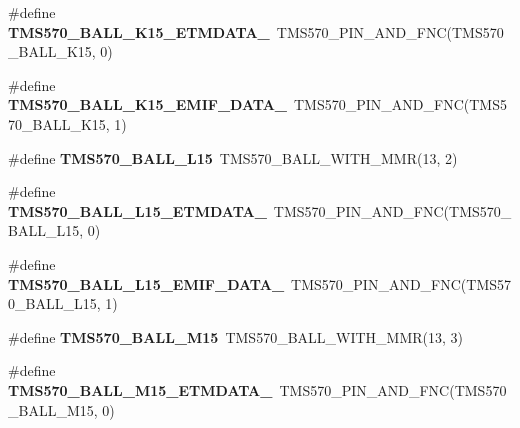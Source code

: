 \begin{DoxyCompactItemize}
\item 
\mbox{\label{tms570lc4357-pins_8h_a6abf2d88ba42097d22c416eb3ec99c76}} 
\#define {\bfseries T\+M\+S570\+\_\+\+B\+A\+L\+L\+\_\+\+K15\+\_\+\+E\+T\+M\+D\+A\+T\+A\+\_}~T\+M\+S570\+\_\+\+P\+I\+N\+\_\+\+A\+N\+D\+\_\+\+F\+NC(T\+M\+S570\+\_\+\+B\+A\+L\+L\+\_\+\+K15, 0)
\item 
\mbox{\label{tms570lc4357-pins_8h_a5742dc7d2b26fbe5a4986009c8fdc75c}} 
\#define {\bfseries T\+M\+S570\+\_\+\+B\+A\+L\+L\+\_\+\+K15\+\_\+\+E\+M\+I\+F\+\_\+\+D\+A\+T\+A\+\_}~T\+M\+S570\+\_\+\+P\+I\+N\+\_\+\+A\+N\+D\+\_\+\+F\+NC(T\+M\+S570\+\_\+\+B\+A\+L\+L\+\_\+\+K15, 1)
\item 
\mbox{\label{tms570lc4357-pins_8h_a1db68205f6e199d164d67c6847e1fc36}} 
\#define {\bfseries T\+M\+S570\+\_\+\+B\+A\+L\+L\+\_\+\+L15}~T\+M\+S570\+\_\+\+B\+A\+L\+L\+\_\+\+W\+I\+T\+H\+\_\+\+M\+MR(13, 2)
\item 
\mbox{\label{tms570lc4357-pins_8h_ad6840fd16bf18f681fe82a1b625f6f8f}} 
\#define {\bfseries T\+M\+S570\+\_\+\+B\+A\+L\+L\+\_\+\+L15\+\_\+\+E\+T\+M\+D\+A\+T\+A\+\_}~T\+M\+S570\+\_\+\+P\+I\+N\+\_\+\+A\+N\+D\+\_\+\+F\+NC(T\+M\+S570\+\_\+\+B\+A\+L\+L\+\_\+\+L15, 0)
\item 
\mbox{\label{tms570lc4357-pins_8h_aa8f11c8b56f97cc585b0ae4b6296056a}} 
\#define {\bfseries T\+M\+S570\+\_\+\+B\+A\+L\+L\+\_\+\+L15\+\_\+\+E\+M\+I\+F\+\_\+\+D\+A\+T\+A\+\_}~T\+M\+S570\+\_\+\+P\+I\+N\+\_\+\+A\+N\+D\+\_\+\+F\+NC(T\+M\+S570\+\_\+\+B\+A\+L\+L\+\_\+\+L15, 1)
\item 
\mbox{\label{tms570lc4357-pins_8h_aea686635fd948c0124ff0323afc6760e}} 
\#define {\bfseries T\+M\+S570\+\_\+\+B\+A\+L\+L\+\_\+\+M15}~T\+M\+S570\+\_\+\+B\+A\+L\+L\+\_\+\+W\+I\+T\+H\+\_\+\+M\+MR(13, 3)
\item 
\mbox{\label{tms570lc4357-pins_8h_adc50016a8e9c0fad14581e4855a6e377}} 
\#define {\bfseries T\+M\+S570\+\_\+\+B\+A\+L\+L\+\_\+\+M15\+\_\+\+E\+T\+M\+D\+A\+T\+A\+\_}~T\+M\+S570\+\_\+\+P\+I\+N\+\_\+\+A\+N\+D\+\_\+\+F\+NC(T\+M\+S570\+\_\+\+B\+A\+L\+L\+\_\+\+M15, 0)
\item 
\mbox{\label{tms570lc4357-pins_8h_aedbaf7ad6cdba2cfb15646e82ff53127}} 

\end{DoxyCompactItemize}
